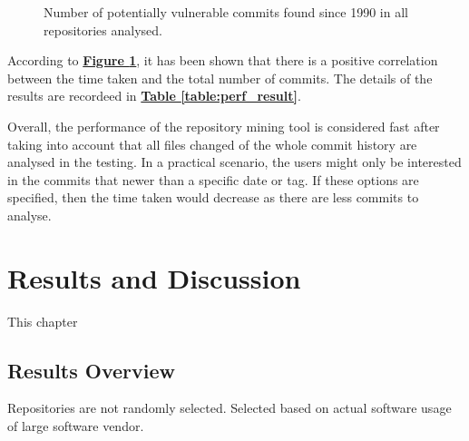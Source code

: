 \documentclass[12pt, a4paper]{report}
\begin{document}
\begin{figure}[H]
  \centering
  \caption{Number of potentially vulnerable commits found since 1990 in all repositories analysed.}
  \label{figure:perf_result}
\end{figure}

According to \hyperref[figure:perf_result]{\textbf{Figure \ref*{figure:perf_result}}}, it has been
shown that there is a positive correlation between the time taken and the total number of commits.
The details of the results are recordeed in \hyperref[table:perf_result]{\textbf{Table
\ref*{table:perf_result}}}.

Overall, the performance of the repository mining tool is considered fast after taking into account
that all files changed of the whole commit history are analysed in the testing. In a practical
scenario, the users might only be interested in the commits that newer than a specific date or tag.
If these options are specified, then the time taken would decrease as there are less commits to
analyse.

\chapter{Results and Discussion}
This chapter

\section{Results Overview}
Repositories are not randomly selected. Selected based on actual software usage of large software
vendor.
\end{document}
